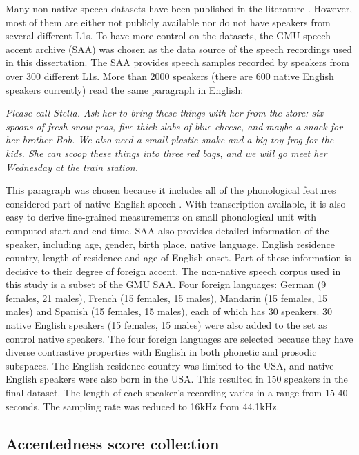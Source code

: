 Many non-native speech datasets have been published in the literature \citep{raab2007non}. However, most of them are either not publicly available nor do not have speakers from several different L1s. To have more control on the datasets, the GMU speech accent archive (SAA) \citep{weinberger2013speech} was chosen as the data source of the speech recordings used in this dissertation. The SAA provides speech samples recorded by speakers from over 300 different L1s. More than 2000 speakers (there are 600 native English speakers currently) read the same paragraph in English:

\vspace{4pt}
\textit{Please call Stella.  Ask her to bring these things with her from the store: six spoons of fresh snow peas, five thick slabs of blue cheese, and maybe a snack for her brother Bob. We also need a small plastic snake and a big toy frog for the kids. She can scoop these things into three red bags, and we will go meet her Wednesday at the train station.}
\vspace{4pt}

This paragraph was chosen because it includes all of the phonological features considered part of native English speech \citep{kunath2010wisdom}. With transcription available, it is also easy to derive fine-grained measurements on small phonological unit with computed start and end time. SAA also provides detailed information of the speaker, including age, gender, birth place, native language, English residence country, length of residence and age of English onset. Part of these information is decisive to their degree of foreign accent. The non-native speech corpus used in this study is a subset of the GMU SAA. Four foreign languages: German (9 females, 21 males), French (15 females, 15 males), Mandarin (15 females, 15 males) and Spanish (15 females, 15 males), each of which has 30 speakers. 30 native English speakers (15 females, 15 males) were also added to the set as control native speakers. The four foreign languages are selected because they have diverse contrastive properties with English in both phonetic and prosodic subspaces. The English residence country was limited to the USA, and native English speakers were also born in the USA. This resulted in 150 speakers in the final dataset. The length of each speaker's recording varies in a range from 15-40 seconds. The sampling rate was reduced to 16kHz from 44.1kHz.



\subsection{Accentedness score collection}

